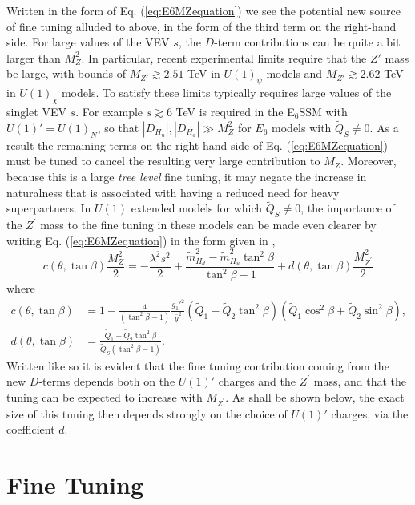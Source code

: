 \documentclass[preprint,amsmath,amssymb,aps,superscriptaddress,prd,showpacs,floatfix]{revtex4-1}
\begin{document}
Written in the form of Eq. (\ref{eq:E6MZequation}) we see the potential new source of fine tuning alluded to above, in the form of the third term on the right-hand side. For large values of the VEV $s$, the $D$-term contributions can be quite a bit larger than $M_Z^2$. In particular, recent experimental limits \cite{Aad:2014cka} require that the $Z'$ mass be large, with bounds of $M_{Z'}\gtrsim 2.51$ TeV in $U(1)_\psi$ models and $M_{Z'}\gtrsim 2.62$ TeV in $U(1)_\chi$ models. To satisfy these limits typically requires large values of the singlet VEV $s$. For example $s\gtrsim 6$ TeV is required in the E$_6$SSM with $U(1)'=U(1)_N$, so that $|D_{H_u}|,|D_{H_d}|\gg M_Z^2$ for $E_6$ models with $\tilde{Q}_S\neq 0$. As a result the remaining terms on the right-hand side of Eq. (\ref{eq:E6MZequation}) must be tuned to cancel the resulting very large contribution to $M_Z$. Moreover, because this is a large \textit{tree level} fine tuning, it may negate the increase in naturalness that is associated with having a reduced need for heavy superpartners. In $U(1)$ extended models for which $\tilde{Q}_S\neq 0$, the importance of the $Z^\prime$ mass to the fine tuning in these models can be made even clearer by writing Eq. (\ref{eq:E6MZequation}) in the form given in \cite{Athron:2013ipa},
\begin{equation}\label{eq:originalE6MZequation}
c(\theta,\tan\beta)\frac{M_Z^2}{2}=-\frac{\lambda^2 s^2}{2}+\frac{\tilde{m}_{H_d}^2-\tilde{m}_{H_u}^2\tan^2\beta}{\tan^2\beta-1}+d(\theta,\tan\beta)\frac{M_{Z^\prime}^2}{2}
\end{equation}
where 
\begin{align}
c(\theta,\tan\beta)&=1-\frac{4}{\left ( \tan^2\beta-1\right )}\frac{g_1'^2}{\bar{g}^2}\left ( \tilde{Q}_1-\tilde{Q}_2\tan^2\beta \right )\left ( \tilde{Q}_1\cos^2\beta+\tilde{Q}_2\sin^2\beta \right ),\label{eq:cdefn}\\
d(\theta,\tan\beta)&= \frac{\tilde{Q}_1-\tilde{Q}_2\tan^2\beta}{\tilde{Q}_S\left ( \tan^2\beta - 1\right )}.\label{eq:ddefn}
\end{align}
Written like so it is evident that the fine tuning contribution coming from the new $D$-terms depends both on the $U(1)'$ charges and the $Z^\prime$ mass, and that the tuning can be expected to increase with $M_{Z^\prime}$. As shall be shown below, the exact size of this tuning then depends strongly on the choice of $U(1)'$ charges, via the coefficient $d$. 
\section{\label{sec:tuning}Fine Tuning}
\end{document}
